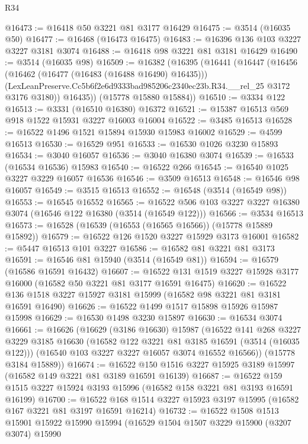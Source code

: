 \begin{lexlean}{R34}
\begin{coremodule}
@16473 := @16418 @50 @3221 @81 @3177 @16429
@16475 := @3514 (@16035 @50)
@16477 := @16468 (@16473 @16475)
@16483 := @16396 @136 @103 @3227 @3227 @3181 @3074
@16488 := @16418 @98 @3221 @81 @3181 @16429
@16490 := @3514 (@16035 @98)
@16509 := @16382
    (@16395
      (@16441
        (@16447
          (@16456
            (@16462 (@16477 (@16483 (@16488 @16490) @16435)))
            (LexLeanPreserve.Cc5b6f2e6d9333bad985206c2340ec23b.R34.__rel_25 @3172 @3176 @3180))
          @16435))
      (@15778 @15880 @15884))
@16510 := @3334 @122
@16513 := @3331 (@16510 @16380) @16372
@16521 := @15387 @16513 @569 @918 @1522 @15931 @3227 @16003 @16004
@16522 := @3485 @16513
@16528 := @16522 @1496 @1521 @15894 @15930 @15983 @16002
@16529 := @4599 @16513
@16530 := @16529 @951
@16533 := @16530 @1026 @3230 @15893
@16534 := @3040 @16057
@16536 := @3040 @16380 @3074
@16539 := @16533 (@16534 @16536) @15983
@16540 := @16522 @266
@16545 := @16540 @1025 @3227 @3229 @16057 @16536
@16546 := @3509 @16513
@16548 := @16546 @98 @16057
@16549 := @3515 @16513
@16552 := @16548 (@3514 (@16549 @98))
@16553 := @16545 @16552
@16565 := @16522 @506 @103 @3227 @3227 @16380 @3074 (@16546 @122 @16380 (@3514 (@16549 @122)))
@16566 := @3534 @16513
@16573 := @16528 (@16539 (@16553 (@16565 @16566)) (@15778 @15889 @15892))
@16579 := @16522 @126 @1520 @3227 @15929 @3173 @16001
@16582 := @5447 @16513 @101 @3227
@16586 := @16582 @81 @3221 @81 @3173
@16591 := @16546 @81 @15940 (@3514 (@16549 @81))
@16594 := @16579 (@16586 @16591 @16432)
@16607 := @16522 @131 @1519 @3227 @15928 @3177 @16000 (@16582 @50 @3221 @81 @3177 @16591 @16475)
@16620 := @16522 @136 @1518 @3227 @15927 @3181 @15999 (@16582 @98 @3221 @81 @3181 @16591 @16490)
@16626 := @16522 @1499 @1517 @15898 @15926 @15987 @15998
@16629 := @16530 @1498 @3230 @15897
@16630 := @16534 @3074
@16661 := @16626
    (@16629
      (@3186 @16630)
      @15987
      (@16522
        @141
        @268
        @3227
        @3229
        @3185
        @16630
        (@16582 @122 @3221 @81 @3185 @16591 (@3514 (@16035 @122)))
        (@16540 @103 @3227 @3227 @16057 @3074 @16552 @16566))
      (@15778 @3184 @15889))
@16674 := @16522 @150 @1516 @3227 @15925 @3189 @15997 (@16582 @149 @3221 @81 @3189 @16591 @16139)
@16687 := @16522 @159 @1515 @3227 @15924 @3193 @15996 (@16582 @158 @3221 @81 @3193 @16591 @16199)
@16700 := @16522 @168 @1514 @3227 @15923 @3197 @15995 (@16582 @167 @3221 @81 @3197 @16591 @16214)
@16732 := @16522
    @1508
    @1513
    @15901
    @15922
    @15990
    @15994
    (@16529
      @1504
      @1507
      @3229
      @15900
      (@3207 @3074)
      @15990

\end{coremodule}
\end{lexlean}
